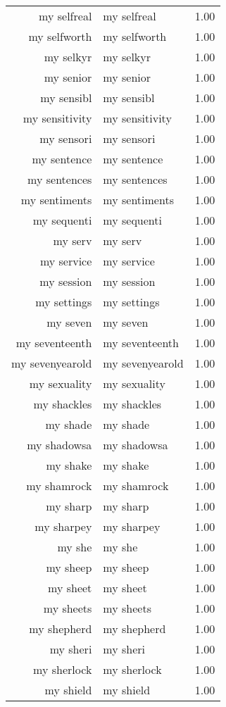 \begin{table}[ht]
\begin{tabular}{rlr}
  my selfreal & my selfreal & 1.00 \\ 
  my selfworth & my selfworth & 1.00 \\ 
  my selkyr & my selkyr & 1.00 \\ 
  my senior & my senior & 1.00 \\ 
  my sensibl & my sensibl & 1.00 \\ 
  my sensitivity & my sensitivity & 1.00 \\ 
  my sensori & my sensori & 1.00 \\ 
  my sentence & my sentence & 1.00 \\ 
  my sentences & my sentences & 1.00 \\ 
  my sentiments & my sentiments & 1.00 \\ 
  my sequenti & my sequenti & 1.00 \\ 
  my serv & my serv & 1.00 \\ 
  my service & my service & 1.00 \\ 
  my session & my session & 1.00 \\ 
  my settings & my settings & 1.00 \\ 
  my seven & my seven & 1.00 \\ 
  my seventeenth & my seventeenth & 1.00 \\ 
  my sevenyearold & my sevenyearold & 1.00 \\ 
  my sexuality & my sexuality & 1.00 \\ 
  my shackles & my shackles & 1.00 \\ 
  my shade & my shade & 1.00 \\ 
  my shadowsa & my shadowsa & 1.00 \\ 
  my shake & my shake & 1.00 \\ 
  my shamrock & my shamrock & 1.00 \\ 
  my sharp & my sharp & 1.00 \\ 
  my sharpey & my sharpey & 1.00 \\ 
  my she & my she & 1.00 \\ 
  my sheep & my sheep & 1.00 \\ 
  my sheet & my sheet & 1.00 \\ 
  my sheets & my sheets & 1.00 \\ 
  my shepherd & my shepherd & 1.00 \\ 
  my sheri & my sheri & 1.00 \\ 
  my sherlock & my sherlock & 1.00 \\ 
  my shield & my shield & 1.00 \\ 

\end{tabular}
\end{table}
